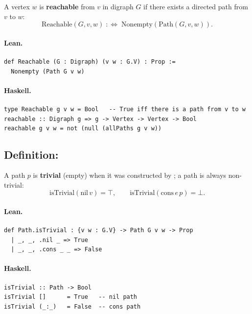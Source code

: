 \documentclass[11pt,a4paper]{article}
\begin{document}
\begin{defn}[Reachability]
A vertex $w$ is \textbf{reachable} from $v$ in digraph $G$ if there exists a
directed path from $v$ to $w$:
\[
  \mathrm{Reachable}(G, v, w) \;:\!\iff\; \mathrm{Nonempty}(\mathrm{Path}(G, v, w)).
\]
\end{defn}

\paragraph{Lean.}
\begin{lstlisting}[style=lean]
def Reachable (G : Digraph) (v w : G.V) : Prop :=
  Nonempty (Path G v w)
\end{lstlisting}

\paragraph{Haskell.}
\begin{lstlisting}[style=haskell]
type Reachable g v w = Bool   -- True iff there is a path from v to w
reachable :: Digraph g => g -> Vertex -> Vertex -> Bool
reachable g v w = not (null (allPaths g v w))
\end{lstlisting}


\subsection{Definition: }

\begin{defn}
A path $p$ is \textbf{trivial} (empty) when it was constructed by ;
a  path is always non-trivial:
\[
  \mathrm{isTrivial}(\mathrm{nil}\,v) = \top, \qquad
  \mathrm{isTrivial}(\mathrm{cons}\,e\,p) = \bot.
\]
\end{defn}

\paragraph{Lean.}
\begin{lstlisting}[style=lean]
def Path.isTrivial : {v w : G.V} -> Path G v w -> Prop
  | _, _, .nil _ => True
  | _, _, .cons _ _ => False
\end{lstlisting}

\paragraph{Haskell.}
\begin{lstlisting}[style=haskell]
isTrivial :: Path -> Bool
isTrivial []      = True   -- nil path
isTrivial (_:_)   = False  -- cons path
\end{lstlisting}
\end{document}
